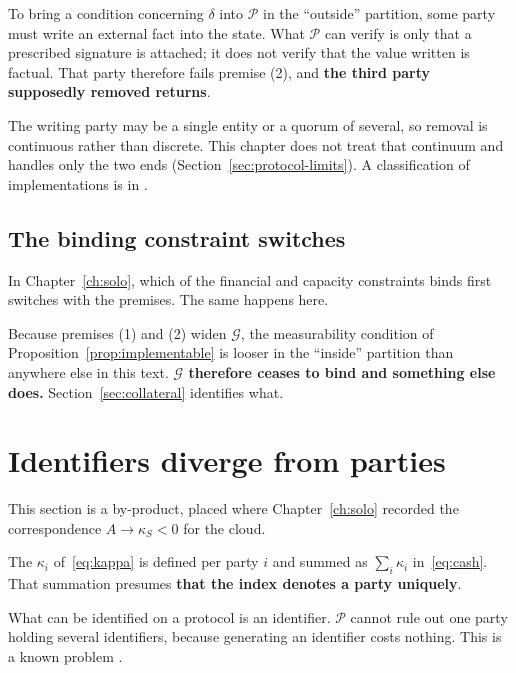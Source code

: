 \begin{remark}
\label{rem:oracle}
To bring a condition concerning $\delta$ into $\mathcal{P}$ in the ``outside'' partition, some
party must write an external fact into the state. What $\mathcal{P}$ can verify is only that
a prescribed signature is attached; it does not verify that the value written is factual.
That party therefore fails premise (2), and \textbf{the third party supposedly removed
returns}.

The writing party may be a single entity or a quorum of several, so removal is continuous
rather than discrete. This chapter does not treat that continuum and handles only the two
ends (Section~\ref{sec:protocol-limits}). A classification of implementations is in
\cite{pasdar2023}.
\end{remark}

\subsection{The binding constraint switches}

In Chapter~\ref{ch:solo}, which of the financial and capacity constraints binds first
switches with the premises. The same happens here.

Because premises (1) and (2) widen $\mathcal{G}$, the measurability condition of
Proposition~\ref{prop:implementable} is looser in the ``inside'' partition than anywhere else
in this text. \textbf{$\mathcal{G}$ therefore ceases to bind and something else does.}
Section~\ref{sec:collateral} identifies what.

\section{Identifiers diverge from parties}
\label{sec:identifier}

This section is a by-product, placed where Chapter~\ref{ch:solo} recorded the correspondence
$A\to\kappa_S<0$ for the cloud.

The $\kappa_i$ of~\eqref{eq:kappa} is defined per party $i$ and summed as $\sum_i\kappa_i$
in~\eqref{eq:cash}. That summation presumes \textbf{that the index denotes a party uniquely}.

What can be identified on a protocol is an identifier. $\mathcal{P}$ cannot rule out one
party holding several identifiers, because generating an identifier costs nothing. This is a
known problem \cite{douceur2002}.

